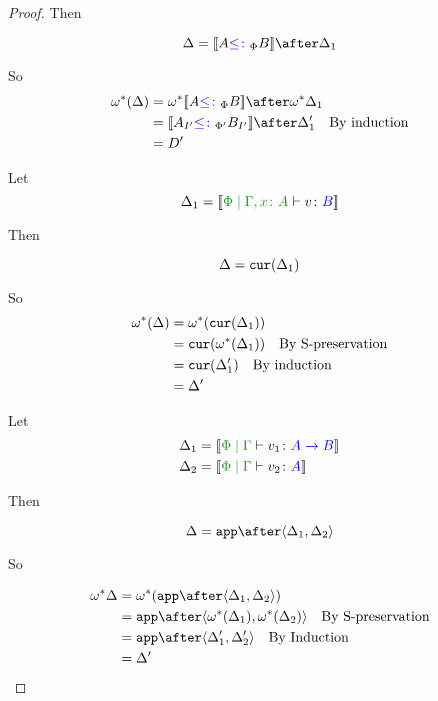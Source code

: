 \documentclass{report}
\begin{document}
\begin{framed}
\begin{proof}
        Then
        
        \begin{equation}
            \D = \deno{A\subtypep B}\after \D_1\\
        \end{equation}
        
        So 
        \begin{align*}
            \w\star(\D) & = \w\star{\deno{A\subtypep B}}\after\w\star\D_1 \\
            & = \deno{A_{I'}\subtypepp B_{I'}}\after\D_1'\qt{By induction}\\
            & = D'
        \end{align*}
        
        \case{\vfun}
        Let \begin{equation}
            \D_1 = \deno{\etyperelation{\P}{\gax}{v}{B}}
        \end{equation}
        
        Then
        
        \begin{equation}
            \Delta = \texttt{cur}(\Delta_1)\\
        \end{equation}
        
        So
        \begin{align*}
            \omega^*(\Delta) & = \omega^*(\texttt{cur}(\Delta_1))\\
            & = \texttt{cur}(\omega^*(\Delta_1))\quad\text{By S-preservation}\\
            & = \texttt{cur}(\Delta_1')\quad\text{By induction}\\
            & = \Delta'
        \end{align*}
        
        \case{\vapply}
        Let \begin{align*}
            \D_1 &= \deno{\gpetyperelation{v_1}{\ab}}\\
            \D_2 &= \deno{\gpetyperelation{v_2}{A}}
        \end{align*}
        
        Then
        
        \begin{equation}
            \D = \app\after\pr{\D_1}{\D_2}\\
        \end{equation}
        
        So
        
        \begin{align*}
            \w\star\D & = \w\star(\app\after\pr{\D_1}{\D_2})\\
            & = \app\after\pr{\w\star(\D_1)}{\w\star(\D_2)}\qt{By S-preservation}\\
            & = \app\after\pr{\D_1'}{\D_2'}\qt{By Induction}\\
            & = \D'
        \end{align*}
        

\end{proof}
\end{framed}
\end{document}
